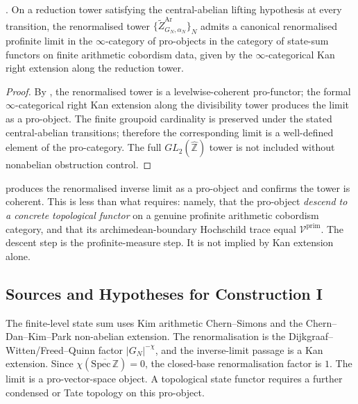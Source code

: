 \begin{theorem}
\label{v4-arith:w10-a:thm:profinite-exists}
\ClaimStatusProvedHereConditional. On a reduction tower satisfying the
central-abelian lifting hypothesis at every transition, the renormalised tower
\(\{\widetilde Z^{\mathrm{Ar}}_{G_{N},\alpha_{N}}\}_{N}\) admits a
canonical renormalised profinite limit in the \(\infty\)-category of
pro-objects in the category of state-sum functors on finite
arithmetic cobordism data, given by the \(\infty\)-categorical Kan
right extension along the reduction tower.
\end{theorem}

\begin{proof}
By , the renormalised tower
is a levelwise-coherent pro-functor; the formal
\(\infty\)-categorical right Kan extension along the divisibility
tower produces the limit as a pro-object. The finite groupoid
cardinality is preserved under the stated central-abelian transitions;
therefore the corresponding limit is a well-defined element of the
pro-category. The full \(GL_{2}(\widehat{\mathbb{Z}})\) tower is not
included without nonabelian obstruction control.
\end{proof}

\begin{remark}
\label{v4-arith:w10-a:rem:construction-I-domain}
 produces the
renormalised inverse limit as a pro-object and confirms the
tower is coherent. This is less than what
 requires: namely, that the
pro-object \emph{descend to a concrete topological functor} on a
genuine profinite arithmetic cobordism category, and that its
archimedean-boundary Hochschild trace equal \(\mathcal V^{\mathrm{prim}}\).
The descent step is the profinite-measure step. It is not
implied by Kan extension alone.
\end{remark}

\subsection{Sources and Hypotheses for Construction I}
\label{v4-arith:w10-a:ah:construction-I}

The finite-level state sum uses Kim arithmetic Chern--Simons and the
Chern--Dan--Kim--Park non-abelian extension. The renormalisation is the
Dijkgraaf--Witten/Freed--Quinn factor
\(|G_N|^{-\chi}\), and the inverse-limit passage is a Kan extension.
Since \(\chi(\overline{\mathrm{Spec}\,\mathbb Z})=0\), the closed-base
renormalisation factor is \(1\). The limit is a pro-vector-space
object. A topological state functor requires a further condensed or
Tate topology on this pro-object.

